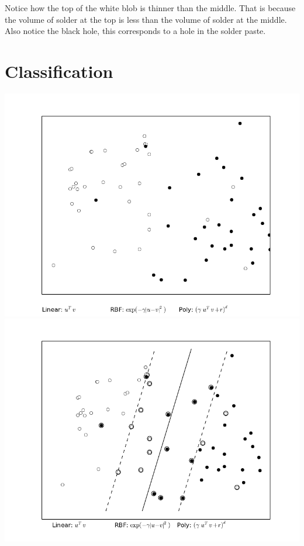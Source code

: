 \documentclass[12pt]{article}
\begin{document}
Notice how the top of the white blob is thinner than the middle.  That is because the volume of solder at the top is less than the volume of solder at the middle. Also notice the black hole, this corresponds to a hole in the solder paste.
\newpage
\section{Classification}
\includegraphics[scale=0.8]{images/Classification/data.png}
\newpage
\includegraphics[scale=0.8]{images/Classification/analized_data.png}


\end{document}
